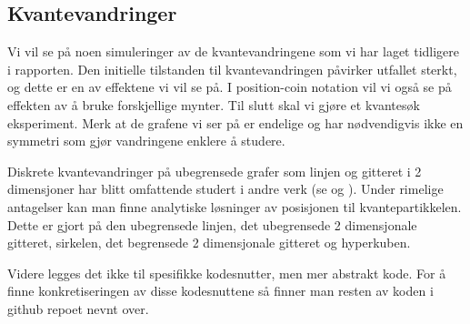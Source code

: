    \subsection{Kvantevandringer}

        Vi vil se på noen simuleringer av de kvantevandringene som vi har laget tidligere i rapporten. Den initielle tilstanden til kvantevandringen påvirker utfallet sterkt, og dette er en av effektene vi vil se på. I position-coin notation vil vi også se på effekten av å bruke forskjellige mynter. Til slutt skal vi gjøre et kvantesøk eksperiment. Merk at de grafene vi ser på er endelige og har nødvendigvis ikke en symmetri som gjør vandringene enklere å studere.

        Diskrete kvantevandringer på ubegrensede grafer som linjen og gitteret i 2 dimensjoner har blitt omfattende studert i andre verk (se \cite{portugal_2019} og \cite{Venegas_Andraca_2012}). Under rimelige antagelser kan man finne analytiske løsninger av posisjonen til kvantepartikkelen. Dette er gjort på den ubegrensede linjen, det ubegrensede 2 dimensjonale gitteret, sirkelen, det begrensede 2 dimensjonale gitteret og hyperkuben.

        Videre legges det ikke til spesifikke kodesnutter, men mer abstrakt kode. For å finne konkretiseringen av disse kodesnuttene så finner man resten av koden i github repoet nevnt over.
    
